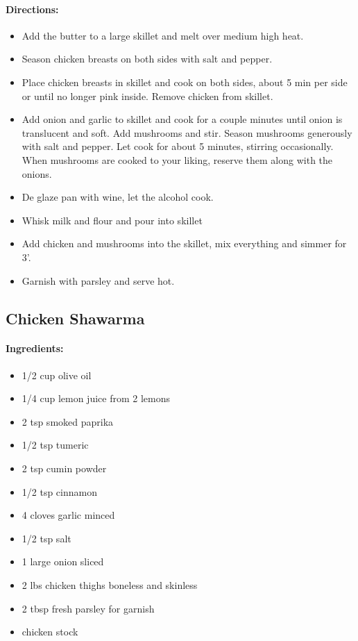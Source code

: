 \documentclass{article}
\begin{document}
\paragraph{Directions:}
\begin{itemize}
	\item Add the butter to a large skillet and melt over medium high heat.
	\item Season chicken breasts on both sides with salt and pepper.
	\item Place chicken breasts in skillet and cook on both sides, about 5 min per side or until no longer pink inside. Remove chicken from skillet.
	\item Add onion and garlic to skillet and cook for a couple minutes until onion is translucent and soft. Add mushrooms and stir. Season mushrooms generously with salt and pepper. Let cook for about 5 minutes, stirring occasionally. When mushrooms are cooked to your liking, reserve them along with the onions.
	\item De glaze pan with wine, let the alcohol cook.
	\item Whisk milk and flour and pour into skillet
	\item Add chicken and mushrooms into the skillet, mix everything and simmer for 3'.
	\item Garnish with parsley and serve hot.
\end{itemize}

\subsection{Chicken Shawarma}

\paragraph{Ingredients:}

\begin{itemize}
	\item 1/2 cup olive oil
	\item 1/4 cup lemon juice from 2 lemons
	\item 2 tsp smoked paprika
	\item 1/2 tsp tumeric
	\item 2 tsp cumin powder
	\item 1/2 tsp cinnamon
	\item 4 cloves garlic minced
	\item 1/2 tsp salt
	\item 1 large onion sliced
	\item 2 lbs chicken thighs boneless and skinless
	\item 2 tbsp fresh parsley for garnish
	\item chicken stock
\end{itemize}
\end{document}
